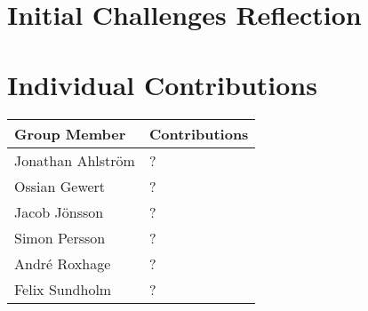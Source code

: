 \documentclass[a4paper]{article}
\begin{document}
\section{Initial Challenges Reflection}


\section*{Individual Contributions}

\begin{tabular}{|l|p{10cm}|}
    \hline
    \textbf{Group Member} & \textbf{Contributions} \\
    \hline
    Jonathan Ahlström & ? \\
    \hline
    Ossian Gewert & ? \\
    \hline
    Jacob Jönsson & ? \\
    \hline
    Simon Persson & ? \\
    \hline
    André Roxhage & ? \\
    \hline
    Felix Sundholm & ? \\
    \hline
\end{tabular}
\end{document}
